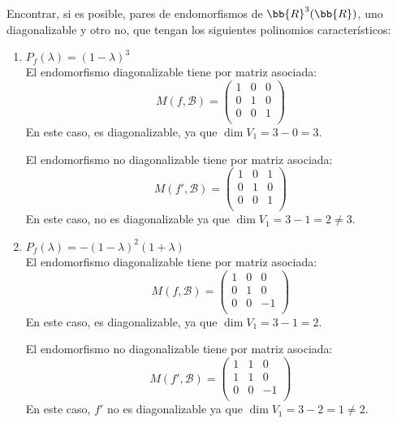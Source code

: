 \begin{ejercicio}
    Encontrar, si es posible, pares de endomorfismos de $\bb{R}^3(\bb{R})$, uno diagonalizable y otro no, que tengan los siguientes polinomios característicos:

    \begin{enumerate}
        \item $P_f(\lambda) = (1-\lambda)^3$\\
        El endomorfismo diagonalizable tiene por matriz asociada:
        $$M(f, \mathcal{B}) = \left( \begin{array}{ccc}
            1 & 0 & 0 \\
            0 & 1 & 0 \\
            0 & 0 & 1 \\
        \end{array}\right)$$
        En este caso, es diagonalizable, ya que $\dim V_1 = 3-0 = 3$.

        El endomorfismo no diagonalizable tiene por matriz asociada:
        $$M(f', \mathcal{B}) = \left( \begin{array}{ccc}
            1 & 0 & 1 \\
            0 & 1 & 0 \\
            0 & 0 & 1 \\
        \end{array}\right)$$
        En este caso, no es diagonalizable ya que $\dim V_1 = 3-1 = 2 \neq 3$.

        \item $P_f(\lambda) = -(1-\lambda)^2(1+\lambda)$\\
        El endomorfismo diagonalizable tiene por matriz asociada:
        $$M(f, \mathcal{B}) = \left( \begin{array}{ccc}
            1 & 0 & 0 \\
            0 & 1 & 0 \\
            0 & 0 & -1 \\
        \end{array}\right)$$
        En este caso, es diagonalizable, ya que $\dim V_1 = 3-1 = 2$.

        El endomorfismo no diagonalizable tiene por matriz asociada:
        $$M(f', \mathcal{B}) = \left( \begin{array}{ccc}
            1 & 1 & 0 \\
            1 & 1 & 0 \\
            0 & 0 & -1 \\
        \end{array}\right)$$
        En este caso, $f'$ no es diagonalizable ya que $\dim V_1 = 3-2 = 1 \neq 2$.


\end{enumerate}
\end{ejercicio}
